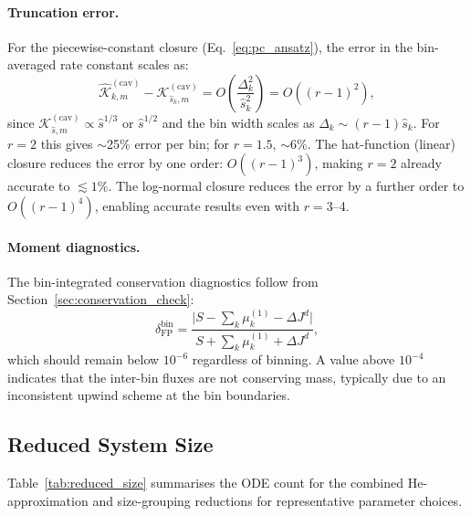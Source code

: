 \documentclass[pdflatex,sn-basic]{sn-jnl} %
\begin{document}
\paragraph{Truncation error.}
For the piecewise-constant closure (Eq.~\ref{eq:pc_ansatz}), the
error in the bin-averaged rate constant scales as:
\begin{equation}\label{eq:truncation_error}
    \hat{\mathcal{K}}_{k,m}^{(\mathrm{cav})} - \mathcal{K}_{\hat{s}_k,m}^{(\mathrm{cav})}
    = O\!\left(\frac{\Delta_k^2}{\hat{s}_k^2}\right)
    = O\!\left((r-1)^2\right),
\end{equation}
since $\mathcal{K}_{\hat{s},m}^{(\mathrm{cav})} \propto \hat{s}^{1/3}$
or $\hat{s}^{1/2}$ and the bin width scales as $\Delta_k \sim (r-1)\hat{s}_k$.
For $r = 2$ this gives $\sim$25\% error per bin; for $r = 1.5$,
$\sim$6\%. The hat-function (linear) closure reduces the error by one order:
$O((r-1)^3)$, making $r = 2$ already accurate to $\lesssim 1\%$.
The log-normal closure reduces the error by a further order to
$O((r-1)^4)$, enabling accurate results even with $r = 3$--4.

\paragraph{Moment diagnostics.}
The bin-integrated conservation diagnostics follow from
Section~\ref{sec:conservation_check}:
\begin{equation}\label{eq:delta_FP_binned}
    \delta_{\mathrm{FP}}^{\mathrm{bin}}
    = \frac{\bigl|S - \sum_k\mu_k^{(1)} - \Delta J^d\bigr|}
           {S + \sum_k\mu_k^{(1)} + \Delta J^d},
\end{equation}
which should remain below $10^{-6}$ regardless of binning. A value
above $10^{-4}$ indicates that the inter-bin fluxes are not conserving
mass, typically due to an inconsistent upwind scheme at the bin
boundaries.

\subsection{Reduced System Size}
\label{sec:reduced_size}

Table~\ref{tab:reduced_size} summarises the ODE count for the
combined He-approximation and size-grouping reductions for
representative parameter choices.
\end{document}
